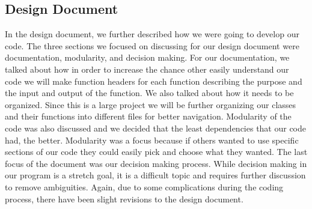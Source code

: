 \documentclass[10pt,letterpaper,onecolumn,draftclsnofoot]{IEEEtran}
\begin{document}
	\subsection{Design Document}
	In the design document, we further described how we were going to develop our code. The three sections we focused on discussing for our design document were documentation, modularity, and decision making. For our documentation, we talked about how in order to increase the chance other easily understand our code we will make function headers for each function describing the purpose and the input and output of the function. We also talked about how it needs to be organized. Since this is a large project we will be further organizing our classes and their functions into different files for better navigation. Modularity of the code was also discussed and we decided that the least dependencies that our code had, the better. Modularity was a focus because if others wanted to use specific sections of our code they could easily pick and choose what they wanted. The last focus of the document was our decision making process. While decision making in our program is a stretch goal, it is a difficult topic and requires further discussion to remove ambiguities. Again, due to some complications during the coding process, there have been slight revisions to the design document.
	
\end{document}
